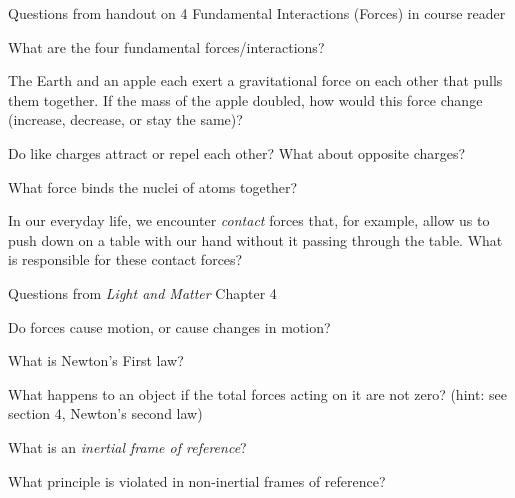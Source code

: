 \documentclass[addpoints,12pt]{exam}
\begin{document}
\noindent Questions from handout on 4 Fundamental Interactions (Forces) in course reader

\begin{questions}

\question[1]
What are the four fundamental forces/interactions?
\fillwithlines{0.5in}

\question[1]
The Earth and an apple each exert a gravitational force on each other that pulls them together. If the mass of the apple doubled, how would this force change (increase, decrease, or stay the same)?
\fillwithlines{0.5in}

\question[1]
Do like charges attract or repel each other? What about opposite charges?
\fillwithlines{0.75in}

\question[1]
What force binds the nuclei of atoms together? \fillwithlines{0.5in}

\question[1]
In our everyday life, we encounter \textit{contact} forces that, for example, allow us to push down on a table with our hand without it passing through the table. What is responsible for these contact forces?
\fillwithlines{0.5in}

\end{questions}

\noindent Questions from \textit{Light and Matter} Chapter 4

\begin{questions}
\question[1]
Do forces cause motion, or cause changes in motion?
\fillwithlines{0.5in}

\question[1]
What is Newton's First law?
\fillwithlines{0.5in}

\question[1]
What happens to an object if the total forces acting on it are not zero? (hint: see section 4, Newton's second law)
\fillwithlines{0.5in}

\question[1]
What is an \textit{inertial frame of reference}?
\fillwithlines{0.5in}

\question[1]
What principle is violated in non-inertial frames of reference?
\fillwithlines{0.5in}

\end{questions}
\end{document}
